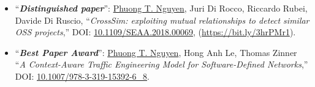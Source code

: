 \documentclass[a4paper,8pt]{article} %
\begin{document}
\begin{itemize}
    \item ``\textbf{\emph{Distinguished paper}}'': \underline{Phuong T. Nguyen}, Juri Di Rocco, Riccardo Rubei, Davide Di Ruscio, ``\emph{CrossSim: exploiting mutual relationships to detect similar OSS projects},'' DOI: \href{https://doi.org/10.1109/SEAA.2018.00069}{10.1109/SEAA.2018.00069}, (\href{https://bit.ly/3hrPMr1}{https://bit.\-ly/3hrPMr1}).		
    
	\item ``\textbf{\emph{Best Paper Award}}'': \underline{Phuong T. Nguyen}, Hong Anh Le, Thomas Zinner ``\emph{A Context-Aware Traffic Engineering Model for Software-Defined Networks},'' DOI: \href{https://doi.org/10.1007/978-3-319-15392-6\_8}{10.1007/978-3-319-15392-6\_8}.%
	
\end{itemize}

\end{document}
